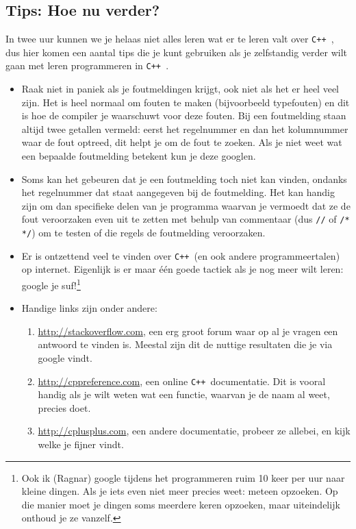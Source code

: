 \documentclass[12pt,a4paper]{article}
\newcommand{\icode}{\lstinline}
\newcommand{\mono}{\texttt}
\newcommand{\cpp}{\mono{C++ }}
\begin{document}
\clearpage
\clearpage
\subsection{Tips: Hoe nu verder?}
In twee uur kunnen we je helaas niet alles leren wat er te leren valt over \cpp, dus hier komen een aantal tips die je kunt gebruiken als je zelfstandig verder wilt gaan met leren programmeren in \cpp. 
\begin{itemize}
	\item Raak niet in paniek als je foutmeldingen krijgt, ook niet als het er heel veel zijn. Het is heel normaal om fouten te maken (bijvoorbeeld typefouten) en dit is hoe de compiler je waarschuwt voor deze fouten. Bij een foutmelding staan altijd twee getallen vermeld: eerst het regelnummer en dan het kolumnummer waar de fout optreed, dit helpt je om de fout te zoeken. Als je niet weet wat een bepaalde foutmelding betekent kun je deze googlen.
	\item Soms kan het gebeuren dat je een foutmelding toch niet kan vinden, ondanks het regelnummer dat staat aangegeven bij de foutmelding. Het kan handig zijn om dan specifieke delen van je programma waarvan je vermoedt dat ze de fout veroorzaken even uit te zetten met behulp van commentaar (dus \icode{//} of \icode{/* */}) om te testen of die regels de foutmelding veroorzaken. 
	\item Er is ontzettend veel te vinden over \cpp (en ook andere programmeertalen) op internet. Eigenlijk is er maar \'e\'en goede tactiek als je nog meer wilt leren: google je suf!\footnote{
			Ook ik (Ragnar) google tijdens het programmeren ruim 10 keer per uur naar kleine dingen. Als je iets even niet meer precies weet: meteen opzoeken. Op die manier moet je dingen soms meerdere keren opzoeken, maar uiteindelijk onthoud je ze vanzelf.
		}
	\item Handige links zijn onder andere:
		\begin{enumerate}
				\item
					\url{http://stackoverflow.com}, een erg groot forum waar op al je vragen een antwoord te vinden is.
					Meestal zijn dit de nuttige resultaten die je via google vindt.
				\item
					\url{http://cppreference.com}, een online \cpp documentatie. Dit is vooral handig als je wilt weten wat een functie, waarvan je de naam al weet, precies doet.
				\item 
					\url{http://cplusplus.com}, een andere documentatie, probeer ze allebei, en kijk welke je fijner vindt.

\end{enumerate}
\end{itemize}
\end{document}
